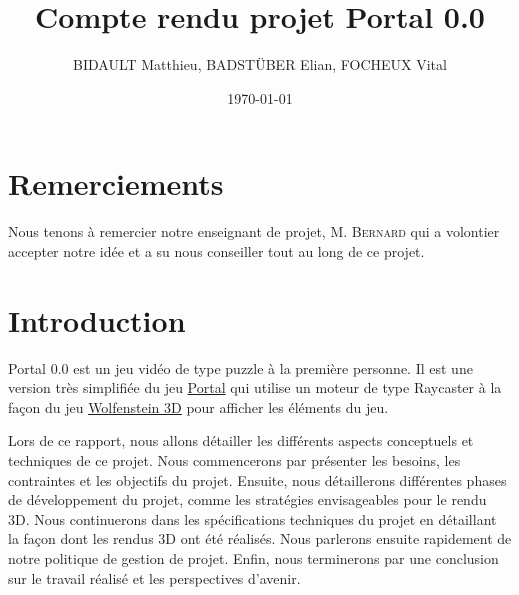 \documentclass[11pt]{article}
\title{Compte rendu projet Portal 0.0}
\author{BIDAULT Matthieu, BADSTÜBER Elian, FOCHEUX Vital}
\date{\today}
\begin{document}
\maketitle

\newpage

\section*{Remerciements}

Nous tenons à remercier notre enseignant de projet, M. \textsc{Bernard} 
qui a volontier accepter notre idée et a su nous conseiller tout au long de ce projet.

\newpage

\tableofcontents

\newpage

\section{Introduction}

Portal 0.0 est un jeu vidéo de type puzzle à la première personne.
Il est une version très simplifiée du jeu \href{https://fr.wikipedia.org/wiki/Portal_(jeu_vid%C3%A9o)}{Portal}\cite{Portal}
qui utilise un moteur de type Raycaster à la façon du jeu
\href{https://fr.wikipedia.org/wiki/Wolfenstein_3D}{Wolfenstein 3D}\cite{Wolfenstein3D} pour afficher les éléments
du jeu.


Lors de ce rapport, nous allons détailler les différents aspects conceptuels et
techniques de ce projet. Nous commencerons par présenter les besoins, les 
contraintes et les objectifs du projet. Ensuite, nous détaillerons différentes phases de 
développement du projet, comme les stratégies envisageables pour le rendu 3D. Nous continuerons
dans les spécifications techniques du projet en détaillant la façon dont les rendus 3D ont été
réalisés. Nous parlerons ensuite rapidement de notre politique de gestion de projet. Enfin,
nous terminerons par une conclusion sur le travail réalisé et les perspectives d'avenir.

\end{document}
